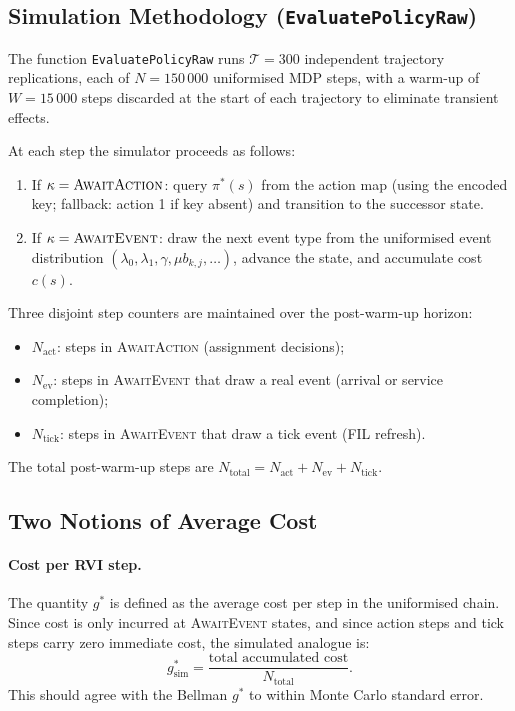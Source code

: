 \documentclass[11pt,a4paper]{article}
\begin{document}
\subsection{Simulation Methodology (\texttt{EvaluatePolicyRaw})}

The function \texttt{EvaluatePolicyRaw} runs $\mathcal{T} = 300$ independent
trajectory replications, each of $N = 150\,000$ uniformised MDP steps, with a
warm-up of $W = 15\,000$ steps discarded at the start of each trajectory to
eliminate transient effects.

At each step the simulator proceeds as follows:
\begin{enumerate}
  \item If $\kappa = \textsc{AwaitAction}$: query $\pi^*(s)$ from the action map
        (using the encoded key; fallback: action 1 if key absent) and transition
        to the successor state.
  \item If $\kappa = \textsc{AwaitEvent}$: draw the next event type from the
        uniformised event distribution $(\lambda_0, \lambda_1, \gamma,
        \mu b_{k,j}, \ldots)$, advance the state, and accumulate cost $c(s)$.
\end{enumerate}

Three disjoint step counters are maintained over the post-warm-up horizon:
\begin{itemize}
  \item $N_\text{act}$: steps in \textsc{AwaitAction} (assignment decisions);
  \item $N_\text{ev}$: steps in \textsc{AwaitEvent} that draw a real event
        (arrival or service completion);
  \item $N_\text{tick}$: steps in \textsc{AwaitEvent} that draw a tick event
        (FIL refresh).
\end{itemize}
The total post-warm-up steps are $N_\text{total} = N_\text{act} + N_\text{ev} +
N_\text{tick}$.

\subsection{Two Notions of Average Cost}

\paragraph{Cost per RVI step.}
The quantity $g^*$ is defined as the average cost per step in the uniformised
chain.  Since cost is only incurred at \textsc{AwaitEvent} states, and since
action steps and tick steps carry zero immediate cost, the simulated analogue is:
\begin{equation}
  g^*_\text{sim}
    = \frac{\text{total accumulated cost}}{N_\text{total}}.
  \label{eq:g_per_step}
\end{equation}
This should agree with the Bellman $g^*$ to within Monte Carlo standard error.
\end{document}
